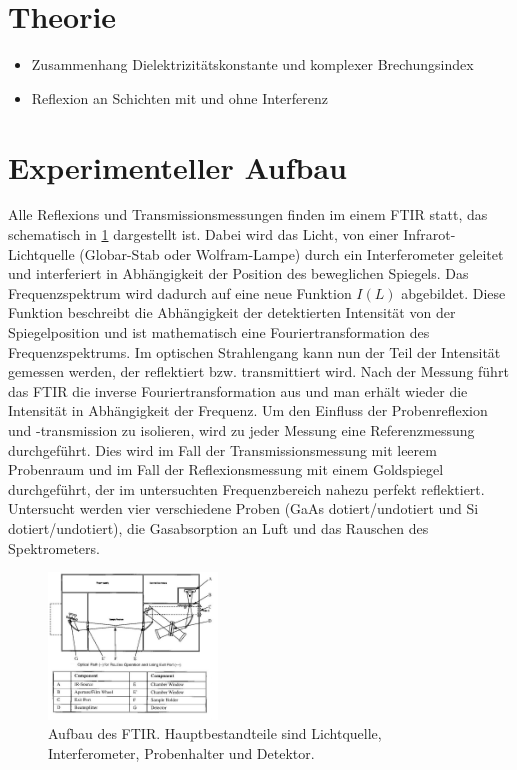 \documentclass[paper=a4,fontsize=10pt,DIV=18,twocolumn,parskip=half]{scrartcl}
\numberwithin{equation}{section}    %
\begin{document}

\section{Theorie}
\begin{itemize}
\item Zusammenhang Dielektrizitätskonstante und komplexer Brechungsindex
\item Reflexion an Schichten mit und ohne Interferenz
\end{itemize}


\section{Experimenteller Aufbau}

Alle Reflexions und Transmissionsmessungen finden im einem  FTIR statt, das 
schematisch in \ref{ftir} dargestellt ist. Dabei wird das Licht, von einer 
Infrarot-Lichtquelle (Globar-Stab oder Wolfram-Lampe) durch ein Interferometer 
geleitet und interferiert in Abhängigkeit der Position des beweglichen Spiegels. 
Das Frequenzspektrum wird dadurch auf eine neue Funktion $I(L)$ abgebildet. 
Diese Funktion beschreibt die Abhängigkeit der detektierten Intensität von der 
Spiegelposition und ist mathematisch eine Fouriertransformation des 
Frequenzspektrums. Im optischen Strahlengang kann nun der Teil der Intensität 
gemessen werden, der reflektiert bzw. transmittiert wird. Nach der Messung führt 
das FTIR die inverse Fouriertransformation aus und man erhält wieder die  
Intensität in Abhängigkeit der Frequenz. Um den Einfluss der Probenreflexion und 
-transmission zu isolieren, wird zu jeder Messung eine Referenzmessung 
durchgeführt. Dies wird im Fall der Transmissionsmessung mit leerem Probenraum 
und im Fall der Reflexionsmessung mit einem Goldspiegel durchgeführt, der im 
untersuchten Frequenzbereich nahezu perfekt reflektiert.
Untersucht werden vier verschiedene Proben (GaAs dotiert/undotiert und Si 
dotiert/undotiert), die Gasabsorption an Luft und das Rauschen des 
Spektrometers.

\begin{figure}
\centering
    \includegraphics[width=0.4\textwidth]{Bilder/FTIR}
    \caption{Aufbau des FTIR. Hauptbestandteile sind Lichtquelle, 
    Interferometer, Probenhalter und Detektor.}
    \label{ftir}
\end{figure}
\end{document}
